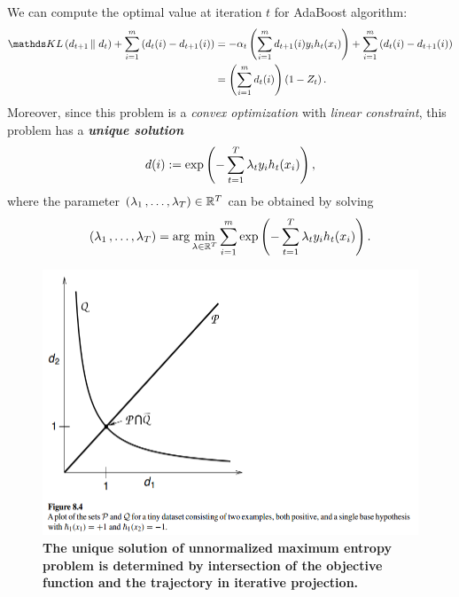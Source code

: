 \documentclass[11pt]{article}
\begin{document}
\begin{itemize}
\begin{remark}
We can compute the optimal value at iteration $t$ for AdaBoost algorithm:
\begin{align*}
\kl{d_{t+1}}{d_t} + \sum_{i=1}^{m}\paren{d_t(i) - d_{t+1}(i)}
&= -\alpha_t  \paren{ \sum_{i=1}^{m}d_{t+1}(i) y_i h_t(x_i)} + \sum_{i=1}^{m}\paren{d_t(i) - d_{t+1}(i)}\\
&= \paren{\sum_{i=1}^{m}d_t(i)}  \paren{1 - Z_t}.
\end{align*} Moreover, since this problem is a \emph{convex optimization} with \emph{linear constraint}, this problem  has a \emph{\textbf{unique solution}}
\begin{align}
d(i) := \exp\left(-\sum_{t=1}^{T}\lambda_t y_i h_t(x_i)\right),  \label{eqn: max_ent_unnormalized_sol}
\end{align} where the parameter $(\lambda_1 \,{,}\ldots{,}\, \lambda_T) \in {\mathbb R}^{T}$ can be obtained by solving
\begin{align}
(\lambda_1 \,{,}\ldots{,}\, \lambda_T) = \arg\min_{\lambda \in {\mathbb R}^{T}}\sum_{i=1}^{m}\exp\left(-\sum_{t=1}^{T}\lambda_t y_i h_t(x_i)\right).  \label{eqn: max_ent_unnormalized_sol_param}
\end{align}


\end{remark}

\begin{figure}
\begin{minipage}[h!]{1\linewidth}
  \centering
  \centerline{\includegraphics[scale = 0.35]{max_ent_boost_unique.png}}
\end{minipage}
\caption{\footnotesize{\textbf{The unique solution of unnormalized maximum entropy problem is determined by intersection of  the objective function and the trajectory in iterative projection.   \citep{schapire2012boosting}}}}
\label{fig: max_ent_boost_unique}
\end{figure}


\end{itemize}
\end{document}
